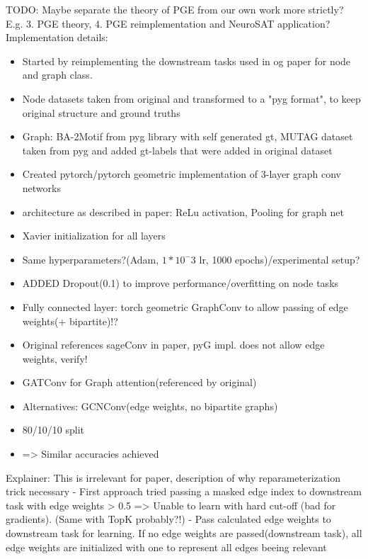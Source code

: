 TODO: Maybe separate the theory of PGE from our own work more strictly? E.g. 3. PGE theory, 4. PGE reimplementation and NeuroSAT application? \\
Implementation details:
\begin{itemize}
    \item Started by reimplementing the downstream tasks used in og paper for node and graph class.
    \item Node datasets taken from original and transformed to a "pyg format", to keep original structure and ground truths
    \item Graph: BA-2Motif from pyg library with self generated gt, MUTAG dataset taken from pyg and added gt-labels that were added in original dataset
    \item Created pytorch/pytorch geometric implementation of 3-layer graph conv networks
    \item architecture as described in paper: ReLu activation, Pooling for graph net
    \item Xavier initialization for all layers
    \item Same hyperparameters?(Adam, $1*10^-3$ lr, 1000 epochs)/experimental setup?
    \item ADDED Dropout(0.1) to improve performance/overfitting on node tasks
    \item Fully connected layer: torch geometric GraphConv to allow passing of edge weights(+ bipartite)!?
    \item Original references sageConv in paper, pyG impl. does not allow edge weights, verify!
    \item GATConv for Graph attention(referenced by original)
    \item Alternatives: GCNConv(edge weights, no bipartite graphs)
    \item 80/10/10 split
    \item => Similar accuracies achieved
\end{itemize}
 

 Explainer:
 This is irrelevant for paper, description of why reparameterization trick necessary
 - First approach tried passing a masked edge index to downstream task with edge weights > 0.5
 => Unable to learn with hard cut-off (bad for gradients). (Same with TopK probably?!)
 - Pass calculated edge weights to downstream task for learning. If no edge weights are passed(downstream task), all edge weights are initialized with one to represent all edges beeing relevant
 


